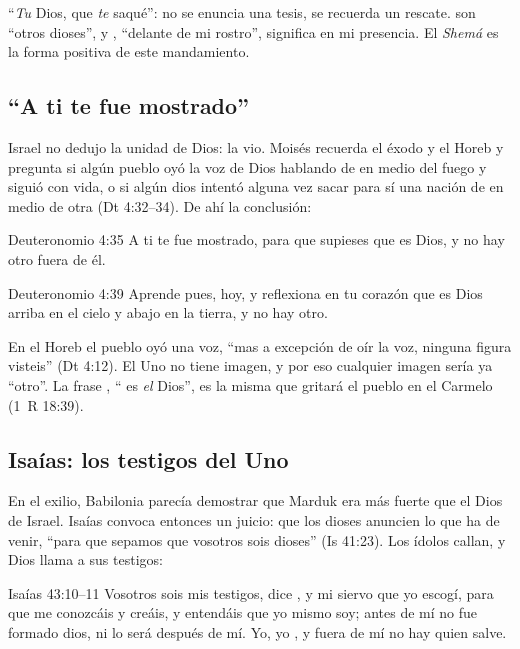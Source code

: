 ``\emph{Tu} Dios, que \emph{te} saqué'': no se enuncia una tesis, se recuerda un rescate.  son ``otros dioses'', y , ``delante de mi rostro'', significa en mi presencia. El \emph{Shemá} es la forma positiva de este mandamiento.

\subsection{“A ti te fue mostrado”}
Israel no dedujo la unidad de Dios: la vio. Moisés recuerda el éxodo y el Horeb y pregunta si algún pueblo oyó la voz de Dios hablando de en medio del fuego y siguió con vida, o si algún dios intentó alguna vez sacar para sí una nación de en medio de otra (Dt 4:32--34). De ahí la conclusión:

\begin{verso}{Deuteronomio 4:35}
A ti te fue mostrado, para que supieses que \SENOR{} es Dios, y no hay otro fuera de él.
\end{verso}
\begin{verso}{Deuteronomio 4:39}
Aprende pues, hoy, y reflexiona en tu corazón que \SENOR{} es Dios arriba en el cielo y abajo en la tierra, y no hay otro.
\end{verso}

En el Horeb el pueblo oyó una voz, ``mas a excepción de oír la voz, ninguna figura visteis'' (Dt 4:12). El Uno no tiene imagen, y por eso cualquier imagen sería ya ``otro''. La frase , ``\SENOR{} es \emph{el} Dios'', es la misma que gritará el pueblo en el Carmelo (1~R 18:39).

\subsection{Isaías: los testigos del Uno}
En el exilio, Babilonia parecía demostrar que Marduk era más fuerte que el Dios de Israel. Isaías convoca entonces un juicio: que los dioses anuncien lo que ha de venir, ``para que sepamos que vosotros sois dioses'' (Is 41:23). Los ídolos callan, y Dios llama a sus testigos:

\begin{verso}{Isaías 43:10–11}
Vosotros sois mis testigos, dice \SENOR, y mi siervo que yo escogí, para que me conozcáis y creáis, y entendáis que yo mismo soy; antes de mí no fue formado dios, ni lo será después de mí. Yo, yo \SENOR, y fuera de mí no hay quien salve.
\end{verso}

